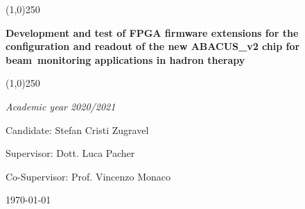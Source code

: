 \documentclass[10pt, a4paper, twoside, onpenany]{report}
\begin{document}
\begin{titlepage}
		\vspace{1.5cm}
		\line(1,0){250}\\
		{\Huge \textbf{Development and test of FPGA firmware extensions for the configuration and readout of the new ABACUS\_v2 chip for beam~monitoring applications in hadron therapy} \par}
		\line(1,0){250}\\	
		\vspace{1.5cm}
		{\Large\itshape Academic year 2020/2021\par}
		\vspace{1cm}
		{\large Candidate: Stefan Cristi Zugravel \par} 
		{\large Supervisor: Dott. Luca Pacher \par}
		{\large Co-Supervisor: Prof. Vincenzo Monaco \par}
		
		\vfill
		
		{\large \today\par}
	\end{titlepage}
\end{document}
